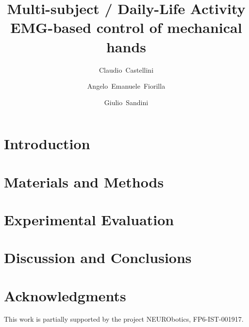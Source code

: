 \documentclass[twocolumn,referee]{svjour2}
\begin{document}
\title{Multi-subject / Daily-Life Activity \\ EMG-based control of mechanical hands}

\author{Claudio~Castellini \and Angelo~Emanuele~Fiorilla \and Giulio~Sandini}

\maketitle

\begin{abstract}
  
\end{abstract}


\section{Introduction}
\label{sec:introduction}


\section{Materials and Methods}
\label{sec:m&ms}


\section{Experimental Evaluation}
\label{sec:exp}


\section{Discussion and Conclusions}
\label{sec:discussion}


\section*{Acknowledgments}

This work is partially supported by the project NEURObotics,
FP6-IST-001917.

{\small
%


}
\end{document}
